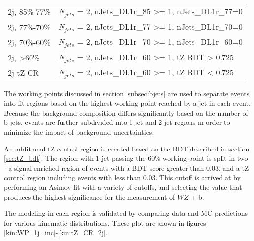 \begin{table}[h]
\begin{tabular}{l|l}
2j, 85\%-77\%   & $N_{jets}$ = 2, nJets\_DL1r\_85 >= 1, nJets\_DL1r\_77=0                     \\
2j, 77\%-70\%   & $N_{jets}$ = 2, nJets\_DL1r\_77 >= 1, nJets\_DL1r\_70=0                     \\
2j, 70\%-60\%   & $N_{jets}$ = 2, nJets\_DL1r\_70 >= 1, nJets\_DL1r\_60=0                      \\
2j, >60\%       & $N_{jets}$ = 2, nJets\_DL1r\_60 >= 1, tZ BDT > 0.725 \\
2j tZ CR        & $N_{jets}$ = 2, nJets\_DL1r\_60 >= 1, tZ BDT < 0.725 \\
\hline\hline
\end{tabular}
\label{tab:regions}
\end{table}

The working points discussed in section \ref{subsec:bjets} are used to separate events into fit regions based on the highest working point reached by a jet in each event. Because the background composition differs significantly based on the number of b-jets, events are further subdivided into 1 jet and 2 jet regions in order to minimize the impact of background uncertainties.

An additional tZ control region is created based on the BDT described in section \ref{sec:tZ_bdt}. The region with 1-jet passing the 60\% working point is split in two - a signal enriched region of events with a BDT score greater than 0.03, and a tZ control region including events with less than 0.03. This cutoff is arrived at by performing an Asimov fit with a variety of cutoffs, and selecting the value that produces the highest significance for the measurement of $WZ$ + b.

The modeling in each region is validated by comparing data and MC predictions for various kinematic distributions. These plot are shown in figures \ref{kin:WP_1j_inc}-\ref{kin:tZ_CR_2j}.


